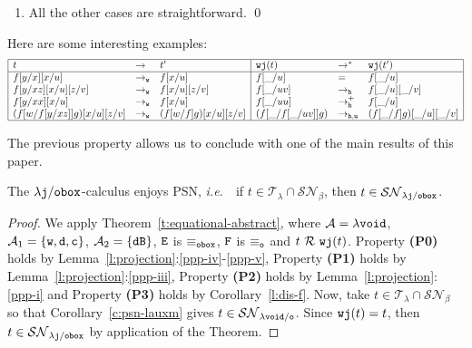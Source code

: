 \documentclass{LMCS}
\newcommand{\ie}{{\it  i.e.}~}
\renewcommand{\>}{\rightarrow}
\def\lam{\lambda}
\newcommand{\Rew}[1]{\rightarrow_{#1}}
\newcommand{\Rewn}[2][*]{\rightarrow^{#1}_{#2}}
\newcommand{\SN}[1]{\mathcal{SN}_{#1}}
\newcommand{\calA}{\mathcal{A}}
\newcommand{\B}{{\tt dB}}
\newcommand{\ttE}{{\tt E}}
\newcommand{\ttF}{{\tt F}}
\newcommand{\R}{\mathcal{R}}
\newcommand{\dis}{{\tt j}}
\newcommand{\Rewplus}[1]{\rightarrow^{+}_{#1}}
\newcommand{\proj}{\wfc}
\newcommand{\Var}{{\tt d}}
\newcommand{\DSubs}{{\tt c}}
\newcommand{\Gc}{{\tt w}}
\newcommand{\set}[1]{ \{ #1 \}}
\newcommand{\ih}{i.h.}
\newcommand{\terms}{\mathcal{T}}
\newcommand{\termslambda}{\terms_{\lam}}
\newcommand{\wfc}{\Gc\dis}
\newcommand{\unboxed}{{\tt u}}
\newcommand{\modulo}[2]{#1/#2}
\newcommand{\ignore}[1]{}
\newcommand{\osym}{{\tt o}}
\newcommand{\ldisf}{\lam \modulo{\dis}{\fsymb}}
\newcommand{\fsymb}{\osymb\boite}
\newcommand{\osymb}{{\tt o}}
\newcommand{\aux}{{\tt void}}
\newcommand{\laux}{\lam\aux}
\newcommand{\lauxm}{\lam\modulo{ \aux }{ \osymb }}
\newcommand{\New}{{\tt h}}
\newcommand{\boite}{{\tt box}}
\newcommand{\void}{\_}
\begin{document}
\begin{enumerate}[$\bullet$]
\begin{enumerate}[$-$]
\ignore{
\item If $t_0$ is an abstraction or an application the property is straightforward
      by the \ih\
\item $t_0 = u[x/v] \Rew{} (\mbox{resp. } \equiv)\ u[x/v'] = t_1$, 
      where $v \Rew{} (\mbox{resp. } \equiv)\ v'$,
      then the property is also straightforward
      by the \ih\
}
 \item All the other cases are straightforward. 
\qed
\end{enumerate}
\end{enumerate}



Here are some interesting examples:
\[ \begin{array}{|lll|lll|}
   \hline
   t & \Rew{} & t'          & \proj(t) & \Rewn{} & \proj(t') \\
   \hline
   f[y/x][x/u] & \Rew{\Gc} & f[x/u] & 
   f[\void/u]  & =  &  f[\void/u] \\
   f[y/x z][x/u][z/v] & \Rew{\Gc} & f[x/u][z/v] & 
   f[\void/uv]  & \Rew{\New} & f[\void/u][\void/v] \\
   f[y/xx][x/u] &  \Rew{\Gc} & f[x/u] & 
   f[\void/uu]  &  \Rewplus{\New} & f[\void/u] \\
   (f[w/f[y/x z]] g)[x/u] [z/v] & \Rew{\Gc} & 
      (f[w/f] g) [x/u] [z/v] & 
   (f[\void/f[\void/uv]] g)  & \Rew{\New, \unboxed} & (f[\void/f] g)[\void/u][\void/v] \\
   \hline
   \end{array} \]



The previous property allows us to conclude with one of the main
results of this paper. 

\begin{thm}[PSN for $\ldisf$]
\label{t:psn-ldisf}
The $\ldisf$-calculus enjoys PSN, \ie\ if $t \in \termslambda \cap \SN{\beta}$, then 
$t \in \SN{\ldisf}$.
\end{thm}

\begin{proof} 
We apply Theorem~\ref{t:equational-abstract}, where $\calA = \laux$,
$\calA_1= \set{\Gc, \Var,\DSubs}$, 
$\calA_2=\set{\B}$, $\ttE$ is
$\equiv_{\fsymb}$, $\ttF$ is $\equiv_{\osym}$ and
$t\ \R\ \proj(t)$. Property {\bf (P0)} holds by
Lemma~\ref{l:projection}:\ref{ppp-iv}-\ref{ppp-v}, Property {\bf (P1)}
holds by Lemma~\ref{l:projection}:\ref{ppp-iii}, Property {\bf (P2)}
holds by Lemma~\ref{l:projection}:\ref{ppp-i} and
Property {\bf (P3)} holds by Corollary~\ref{l:dis-f}.  Now, take $t \in
\termslambda \cap \SN{\beta}$ so that Corollary~\ref{c:psn-lauxm}
gives $t \in \SN{\lauxm}$. Since $\proj(t) = t$, then $t \in
\SN{\ldisf}$ by application of the Theorem.
\end{proof}
\end{document}
